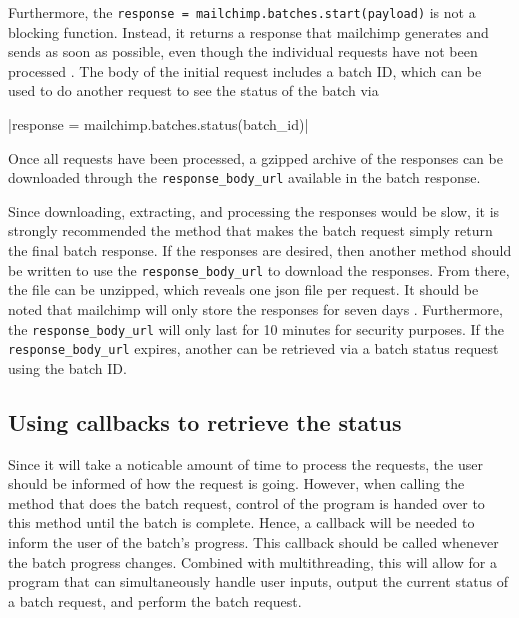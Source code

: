 \documentclass[11pt]{article}
\begin{document}
\inputminted[linenos=true]{python}{mailchimp_examples/batch_request.py}

Furthermore, the \texttt{response = mailchimp.batches.start(payload)} is not a blocking function. Instead, it returns a \gls{response} that \Gls{mailchimp} generates and sends as soon as possible, even though the individual \gls{request}s have not been processed \cite{mailchimp-batch}. The body of the initial \gls{request} includes a \gls{batch} ID, which can be used to do another \gls{request} to see the status of the \gls{batch} via

|response = mailchimp.batches.status(batch_id)|

\noindent
Once all \gls{request}s have been processed, a gzipped archive of the \gls{response}s can be downloaded through the \texttt{response\_body\_url} available in the \gls{batch} \gls{response}.

Since downloading, extracting, and processing the \gls{response}s would be slow, it is strongly recommended the method that makes the \gls{batch} \gls{request} simply return the final \gls{batch} \gls{response}. If the \gls{response}s are desired, then another method should be written to use the \texttt{response\_body\_url} to download the \gls{response}s. From there, the file can be unzipped, which reveals one \acrshort{json} file per \gls{request}. It should be noted that \Gls{mailchimp} will only store the \gls{response}s for seven days \cite{mailchimp-batch}. Furthermore, the \texttt{\gls{response}\_body\_url} will only last for 10 minutes for security purposes. If the \texttt{response\_body\_url} expires, another can be retrieved via a \gls{batch} status \gls{request} using the \gls{batch} ID.

\subsection{Using callbacks to retrieve the status}

Since it will take a noticable amount of time to process the \gls{request}s, the \gls{user} should be informed of how the \gls{request} is going. However, when calling the method that does the \gls{batch} \gls{request}, control of the program is handed over to this method until the \gls{batch} is complete. Hence, a callback will be needed to inform the user of the \gls{batch}'s progress. This callback should be called whenever the \gls{batch} progress changes. Combined with multithreading, this will allow for a program that can simultaneously handle user inputs, output the current status of a \gls{batch} \gls{request}, and perform the \gls{batch} \gls{request}.
\end{document}
